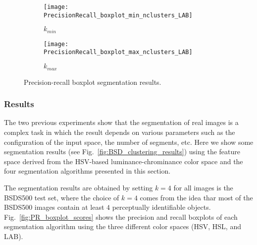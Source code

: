 \begin{figure}[!ht]
    \centering
    \begin{subfigure}[b]{0.49\textwidth}
        \texttt{[image: PrecisionRecall\_boxplot\_min\_nclusters\_LAB]}
        \caption{$k_{min}$}
    \end{subfigure}   
    \begin{subfigure}[b]{0.49\textwidth}
    	\centering
    	\texttt{[image: PrecisionRecall\_boxplot\_max\_nclusters\_LAB]}
        \caption{$k_{max}$}
    \end{subfigure}     
    
        	    
    \caption{Precision-recall boxplot segmentation results.}\label{fig:PR_boxplot_scores_min_max_clusters}    
\end{figure}


\subsubsection{Results}
The two previous experiments show that the segmentation of real images is a complex task in which the result depends on various parameters such as the configuration of the input space, the number of segments, etc. Here we show some segmentation results (see Fig.\ \ref{fig:BSD_clustering_results}) using the feature space derived from the HSV-based luminance-chrominance color space and the four segmentation algorithms presented in this section.

The segmentation results are obtained by setting $k = 4$ for all images is the BSDS500 test set, where the choice of $k = 4$ comes from the idea thar most of the BSDS500 images contain at least $4$ perceptually identifiable objects. Fig.\ \ref{fig:PR_boxplot_scores} shows the precision and recall boxplots of each segmentation algorithm using the three different color spaces (HSV, HSL, and LAB).

